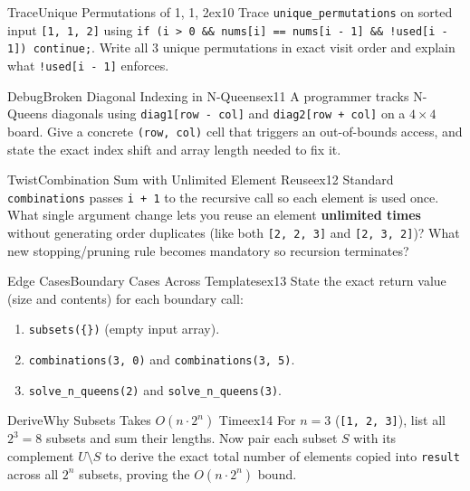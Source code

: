 \documentclass[11pt,a4paper]{article}
\theoremstyle{definition}
\begin{document}
\begin{tryitbox}{Trace}{Unique Permutations of 1, 1, 2}{ex10}
Trace \texttt{unique\_permutations} on sorted input \texttt{[1, 1, 2]} using \texttt{if (i > 0 \&\& nums[i] == nums[i - 1] \&\& !used[i - 1]) continue;}. Write all $3$ unique permutations in exact visit order and explain what \texttt{!used[i - 1]} enforces.
\end{tryitbox}

\begin{tryitbox}{Debug}{Broken Diagonal Indexing in N-Queens}{ex11}
A programmer tracks N-Queens diagonals using \texttt{diag1[row - col]} and \texttt{diag2[row + col]} on a $4 \times 4$ board. Give a concrete \texttt{(row, col)} cell that triggers an out-of-bounds access, and state the exact index shift and array length needed to fix it.
\end{tryitbox}

\begin{tryitbox}{Twist}{Combination Sum with Unlimited Element Reuse}{ex12}
Standard \texttt{combinations} passes \texttt{i + 1} to the recursive call so each element is used once. What single argument change lets you reuse an element \textbf{unlimited times} without generating order duplicates (like both \texttt{[2, 2, 3]} and \texttt{[2, 3, 2]})? What new stopping/pruning rule becomes mandatory so recursion terminates?
\end{tryitbox}

\begin{tryitbox}{Edge Cases}{Boundary Cases Across Templates}{ex13}
State the exact return value (size and contents) for each boundary call:
\begin{enumerate}
    \item \texttt{subsets(\{\})} (empty input array).
    \item \texttt{combinations(3, 0)} and \texttt{combinations(3, 5)}.
    \item \texttt{solve\_n\_queens(2)} and \texttt{solve\_n\_queens(3)}.
\end{enumerate}
\end{tryitbox}

\begin{tryitbox}{Derive}{Why Subsets Takes $O(n \cdot 2^n)$ Time}{ex14}
For $n = 3$ (\texttt{[1, 2, 3]}), list all $2^3 = 8$ subsets and sum their lengths. Now pair each subset $S$ with its complement $U \setminus S$ to derive the exact total number of elements copied into \texttt{result} across all $2^n$ subsets, proving the $O(n \cdot 2^n)$ bound.
\end{tryitbox}
\end{document}
